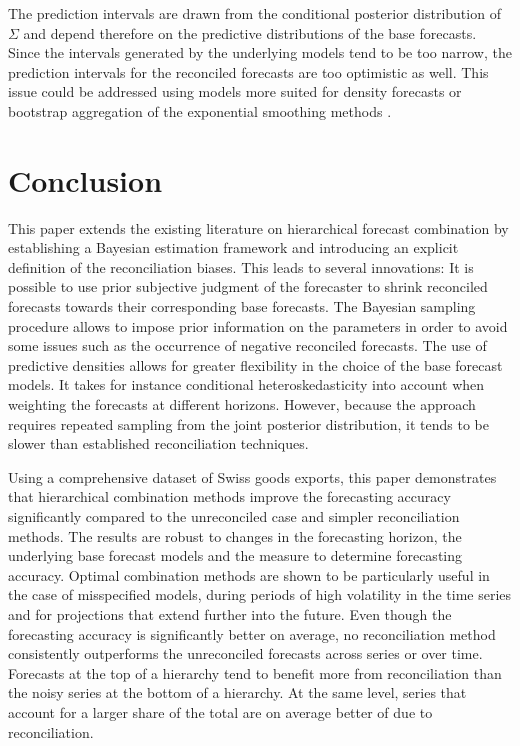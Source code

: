 \documentclass[a4paper,fleqn,11pt]{article}
\begin{document}
The prediction intervals are drawn from the conditional posterior distribution of $\Sigma$ and depend therefore on the predictive distributions of the base forecasts. Since the intervals generated by the underlying models tend to be too narrow, the prediction intervals for the reconciled forecasts are too optimistic as well. This issue could be addressed using models more suited for density forecasts or bootstrap aggregation of the exponential smoothing methods \citep{Bergmeir2016}.

\clearpage

\section{Conclusion}\label{sec:conc}
This paper extends the existing literature on hierarchical forecast combination by establishing a Bayesian estimation framework and introducing an explicit definition of the reconciliation biases. This leads to several innovations: It is possible to use prior subjective judgment of the forecaster to shrink reconciled forecasts towards their corresponding base forecasts. The Bayesian sampling procedure allows to impose prior information on the parameters in order to avoid some issues such as the occurrence of negative reconciled forecasts. The use of predictive densities allows for greater flexibility in the choice of the base forecast models. It takes for instance conditional heteroskedasticity into account when weighting the forecasts at different horizons. However, because the approach requires repeated sampling from the joint posterior distribution, it tends to be slower than established reconciliation techniques.

Using a comprehensive dataset of Swiss goods exports, this paper demonstrates that hierarchical combination methods improve the forecasting accuracy significantly compared to the unreconciled case and simpler reconciliation methods. The results are robust to changes in the forecasting horizon, the underlying base forecast models and the measure to determine forecasting accuracy. Optimal combination methods are shown to be particularly useful in the case of misspecified models, during periods of high volatility in the time series and for projections that extend further into the future. Even though the forecasting accuracy is significantly better on average, no reconciliation method consistently outperforms the unreconciled forecasts across series or over time. Forecasts at the top of a hierarchy tend to benefit more from reconciliation than the noisy series at the bottom of a hierarchy. At the same level, series that account for a larger share of the total are on average better of due to reconciliation.
\end{document}
